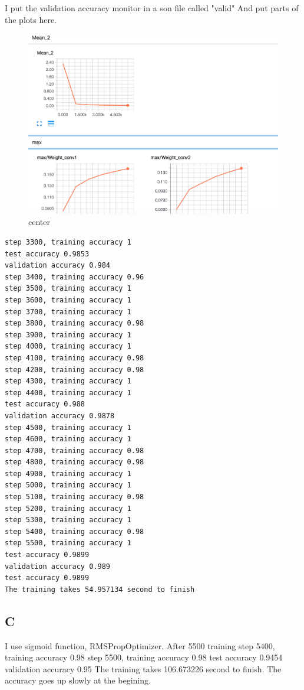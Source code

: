 \documentclass[12pt]{article}
\begin{document}
I put the validation accuracy monitor in a son file called "valid"
And put parts of the plots here. 
\begin{figure}[H]
  \caption{center}
  \centering
    \includegraphics[scale=0.3]{validation.png}
\end{figure}



 \begin{lstlisting}  
step 3300, training accuracy 1
test accuracy 0.9853
validation accuracy 0.984
step 3400, training accuracy 0.96
step 3500, training accuracy 1
step 3600, training accuracy 1
step 3700, training accuracy 1
step 3800, training accuracy 0.98
step 3900, training accuracy 1
step 4000, training accuracy 1
step 4100, training accuracy 0.98
step 4200, training accuracy 0.98
step 4300, training accuracy 1
step 4400, training accuracy 1
test accuracy 0.988
validation accuracy 0.9878
step 4500, training accuracy 1
step 4600, training accuracy 1
step 4700, training accuracy 0.98
step 4800, training accuracy 0.98
step 4900, training accuracy 1
step 5000, training accuracy 1
step 5100, training accuracy 0.98
step 5200, training accuracy 1
step 5300, training accuracy 1
step 5400, training accuracy 0.98
step 5500, training accuracy 1
test accuracy 0.9899
validation accuracy 0.989
test accuracy 0.9899
The training takes 54.957134 second to finish
 \end{lstlisting}  



\subsection{C}
I use sigmoid function, RMSPropOptimizer. After 5500 training
step 5400, training accuracy 0.98
step 5500, training accuracy 0.98
test accuracy 0.9454
validation accuracy 0.95
The training takes 106.673226 second to finish. The accuracy goes up slowly at the begining. 
\end{document}
